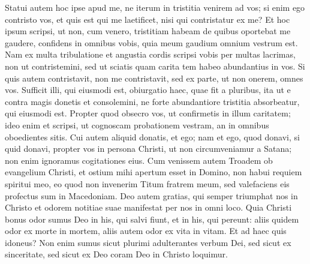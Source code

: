 \begin{biblechapter}  
\verse Statui autem hoc ipse apud me, ne iterum in tristitia venirem ad vos;  
\verse si enim ego contristo vos, et quis est qui me laetificet, nisi qui contristatur ex me? 
\verse Et hoc ipsum scripsi, ut non, cum venero, tristitiam habeam de quibus oportebat me gaudere, confidens in omnibus vobis, quia meum gaudium omnium vestrum est. 
\verse Nam ex multa tribulatione et angustia cordis scripsi vobis per multas lacrimas, non ut contristemini, sed ut sciatis quam carita tem habeo abundantius in vos. 
\verse Si quis autem contristavit, non me contristavit, sed ex parte, ut non onerem, omnes vos. 
\verse Sufficit illi, qui eiusmodi est, obiurgatio haec, quae fit a pluribus, 
\verse ita ut e contra magis donetis et consolemini, ne forte abundantiore tristitia absorbeatur, qui eiusmodi est. 
\verse Propter quod obsecro vos, ut confirmetis in illum caritatem;  
\verse ideo enim et scripsi, ut cognoscam probationem vestram, an in omnibus oboedientes sitis. 
\verse Cui autem aliquid donatis, et ego; nam et ego, quod donavi, si quid donavi, propter vos in persona Christi, 
\verse ut non circumveniamur a Satana; non enim ignoramus cogitationes eius. 
\verse Cum venissem autem Troadem ob evangelium Christi, et ostium mihi apertum esset in Domino, 
\verse non habui requiem spiritui meo, eo quod non invenerim Titum fratrem meum, sed valefaciens eis profectus sum in Macedoniam. 
\verse Deo autem gratias, qui semper triumphat nos in Christo et odorem notitiae suae manifestat per nos in omni loco. 
\verse Quia Christi bonus odor sumus Deo in his, qui salvi fiunt, et in his, qui pereunt: 
\verse aliis quidem odor ex morte in mortem, aliis autem odor ex vita in vitam. Et ad haec quis idoneus? 
\verse Non enim sumus sicut plurimi adulterantes verbum Dei, sed sicut ex sinceritate, sed sicut ex Deo coram Deo in Christo loquimur. 
\end{biblechapter}

